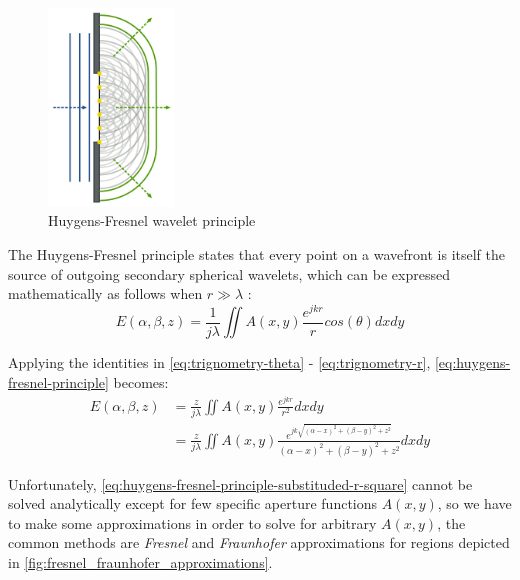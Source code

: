 \begin{figure}[H]
  \centering
  \includegraphics[width=0.3\textwidth]{huygens_wavelets_principle.png}
  \caption{Huygens-Fresnel wavelet principle \cite{Nordmann2007}}\label{fig:huygens_wavelets_principle}
\end{figure}

The Huygens-Fresnel principle states that every point on a wavefront is itself the source of outgoing secondary spherical wavelets, which can be expressed mathematically as follows when $r\gg \lambda$ \cite{Goodman2017}:
\begin{equation}
  E(\alpha, \beta, z) = \frac{1}{j\lambda} \iint A(x,y)\frac{e^{jkr}}{r} cos(\theta) dxdy \label{eq:huygens-fresnel-principle}
\end{equation}

Applying the identities in \cref{eq:trignometry-theta} - \cref{eq:trignometry-r},  \cref{eq:huygens-fresnel-principle} becomes:
\begin{align}
  E(\alpha, \beta, z) & = \frac{z}{j\lambda} \iint A(x,y)\frac{e^{jkr}}{r^2} dxdy                    \label{eq:huygens-fresnel-principle-substituded-cos}                                                      \\
                      & = \frac{z}{j\lambda} \iint A(x,y)\frac{e^{jk\sqrt{(\alpha-x)^2 + (\beta-y)^2 + z^2}}}{(\alpha-x)^2 + (\beta-y)^2 + z^2} dxdy \label{eq:huygens-fresnel-principle-substituded-r-square}
\end{align}

Unfortunately, \cref{eq:huygens-fresnel-principle-substituded-r-square} cannot be solved analytically except for few specific aperture functions $A(x,y)$, so we have to make some approximations in order to solve for arbitrary $A(x,y)$, the common methods are \textit{Fresnel} and \textit{Fraunhofer} approximations for regions depicted in \cref{fig:fresnel_fraunhofer_approximations}.

